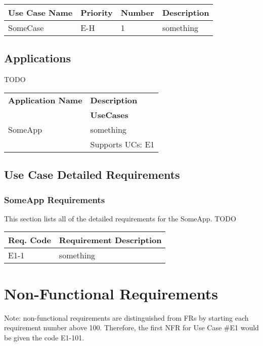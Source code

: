 \documentclass[12pt]{article}
\begin{document}
\begin{table}[!h]
	\begin{tabular}{| l | l | l | l |}
		\hline
		\textbf{Use Case Name} & \textbf{Priority} & \textbf{Number} & \textbf{Description}\\
		\hline
		SomeCase	& E-H & 1 & something\\
		\hline
	\end{tabular}
	\label{tab:UseCases}
\end{table}

\subsection{Applications}

TODO

\begin{table}[!h]
	\begin{tabular}{| l | l |}
		\hline
		\textbf{Application Name} & \textbf{Description}\\ \cline{2-1}
															& \textbf{UseCases}\\
		\hline
		SomeApp	& something\\ \cline{2-1}
						& Supports UCs: E1\\
		\hline
	\end{tabular}
	\label{tab:Applications}
\end{table}

\subsection{Use Case Detailed Requirements}

\subsubsection{SomeApp Requirements}
This section lists all of the detailed requirements for the SomeApp.
TODO

\begin{table}[!h]
	\begin{tabular}{| l | l |}
	 	\hline
		\textbf{Req. Code} & \textbf{Requirement Description}\\
		\hline
		E1-1	& something\\
		\hline
	\end{tabular}
	\label{tab:SomeAppRequirements}
\end{table}


\section{Non-Functional Requirements}
Note: non-functional requirements are distinguished from FRs by starting each requirement number above 100. Therefore, the first 
NFR for Use Case \#E1 would be given the code E1-101.
\end{document}
